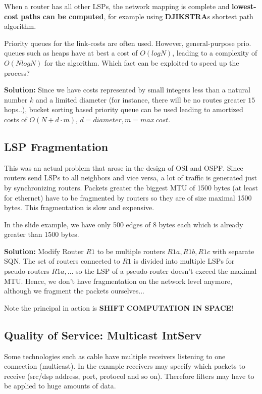 When a router has all other LSPs, the network mapping is complete and \textbf{lowest-cost paths can be computed}, for example using \textbf{DJIKSTRA}s shortest path algorithm.

Priority queues for the link-costs are often used. However, general-purpose prio. queues such as heaps have at best a cost of $O(log N)$, leading to a complexity of $O(N log N)$ for the algorithm. Which fact can be exploited to speed up the process?

\textbf{Solution:} Since we have costs represented by small integers less than a natural number $k$ and a limited diameter (for instance, there will be no routes greater $15$ hops..), bucket sorting based priority queue can be used leading to amortized costs of $O(N + d \cdot m)$, $d = diameter, m = max \ cost$.

\subsection{LSP Fragmentation}

This was an actual problem that arose in the design of OSI and OSPF. Since routers send LSPs to all neighbors and vice versa, a lot of traffic is generated just by synchronizing routers. Packets greater the biggest MTU of 1500 bytes (at least for ethernet) have to be fragmented by routers so they are of size maximal 1500 bytes. This fragmentation is slow and expensive.

In the slide example, we have only 500 edges of 8 bytes each which is already greater than 1500 bytes. 

\textbf{Solution:} Modify Router $R1$ to be multiple routers $R1a, R1b, R1c$ with separate SQN. The set of routers connected to $R1$ is divided into multiple LSPs for pseudo-routers $R1a, \dots$ so the LSP of a pseudo-router doesn't exceed the maximal MTU. Hence, we don't have fragmentation on the network level anymore, although we fragment the packets ourselves...

Note the principal in action is \textbf{SHIFT COMPUTATION IN SPACE}!

\subsection{Quality of Service: Multicast IntServ}

Some technologies such as cable have multiple receivers listening to one connection (multicast). In the example receivers may specify which packets to receive (src/dsp address, port, protocol and so on). Therefore filters may have to be applied to huge amounts of data.

